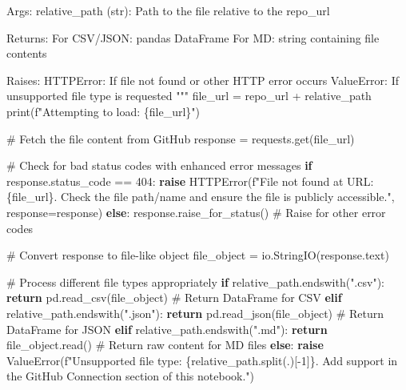 \documentclass[
  11pt,
  letterpaper,
]{book}
\newenvironment{Shaded}{\begin{snugshade}}{\end{snugshade}}
\newcommand{\BuiltInTok}[1]{\textcolor[rgb]{0.00,0.23,0.31}{#1}}
\newcommand{\CommentTok}[1]{\textcolor[rgb]{0.37,0.37,0.37}{#1}}
\newcommand{\ControlFlowTok}[1]{\textcolor[rgb]{0.00,0.23,0.31}{\textbf{#1}}}
\newcommand{\DecValTok}[1]{\textcolor[rgb]{0.68,0.00,0.00}{#1}}
\newcommand{\NormalTok}[1]{\textcolor[rgb]{0.00,0.23,0.31}{#1}}
\newcommand{\OperatorTok}[1]{\textcolor[rgb]{0.37,0.37,0.37}{#1}}
\newcommand{\PreprocessorTok}[1]{\textcolor[rgb]{0.68,0.00,0.00}{#1}}
\newcommand{\SpecialCharTok}[1]{\textcolor[rgb]{0.37,0.37,0.37}{#1}}
\newcommand{\SpecialStringTok}[1]{\textcolor[rgb]{0.13,0.47,0.30}{#1}}
\newcommand{\StringTok}[1]{\textcolor[rgb]{0.13,0.47,0.30}{#1}}
\begin{document}
\begin{Shaded}
\begin{Highlighting}[]
\CommentTok{    Args:}
\CommentTok{        relative\_path (str): Path to the file relative to the repo\_url}

\CommentTok{    Returns:}
\CommentTok{        For CSV/JSON: pandas DataFrame}
\CommentTok{        For MD: string containing file contents}

\CommentTok{    Raises:}
\CommentTok{        HTTPError: If file not found or other HTTP error occurs}
\CommentTok{        ValueError: If unsupported file type is requested}
\CommentTok{    """}
\NormalTok{    file\_url }\OperatorTok{=}\NormalTok{ repo\_url }\OperatorTok{+}\NormalTok{ relative\_path}
    \BuiltInTok{print}\NormalTok{(}\SpecialStringTok{f"Attempting to load: }\SpecialCharTok{\{}\NormalTok{file\_url}\SpecialCharTok{\}}\SpecialStringTok{"}\NormalTok{)}

    \CommentTok{\# Fetch the file content from GitHub}
\NormalTok{    response }\OperatorTok{=}\NormalTok{ requests.get(file\_url)}

    \CommentTok{\# Check for bad status codes with enhanced error messages}
    \ControlFlowTok{if}\NormalTok{ response.status\_code }\OperatorTok{==} \DecValTok{404}\NormalTok{:}
        \ControlFlowTok{raise}\NormalTok{ HTTPError(}\SpecialStringTok{f"File not found at URL: }\SpecialCharTok{\{}\NormalTok{file\_url}\SpecialCharTok{\}}\SpecialStringTok{. Check the file path/name and ensure the file is publicly accessible."}\NormalTok{, response}\OperatorTok{=}\NormalTok{response)}
    \ControlFlowTok{else}\NormalTok{:}
\NormalTok{        response.raise\_for\_status()  }\CommentTok{\# Raise for other error codes}

    \CommentTok{\# Convert response to file{-}like object}
\NormalTok{    file\_object }\OperatorTok{=}\NormalTok{ io.StringIO(response.text)}

    \CommentTok{\# Process different file types appropriately}
    \ControlFlowTok{if}\NormalTok{ relative\_path.endswith(}\StringTok{".csv"}\NormalTok{):}
        \ControlFlowTok{return}\NormalTok{ pd.read\_csv(file\_object)  }\CommentTok{\# Return DataFrame for CSV}
    \ControlFlowTok{elif}\NormalTok{ relative\_path.endswith(}\StringTok{".json"}\NormalTok{):}
        \ControlFlowTok{return}\NormalTok{ pd.read\_json(file\_object)  }\CommentTok{\# Return DataFrame for JSON}
    \ControlFlowTok{elif}\NormalTok{ relative\_path.endswith(}\StringTok{".md"}\NormalTok{):}
        \ControlFlowTok{return}\NormalTok{ file\_object.read()  }\CommentTok{\# Return raw content for MD files}
    \ControlFlowTok{else}\NormalTok{:}
        \ControlFlowTok{raise} \PreprocessorTok{ValueError}\NormalTok{(}\SpecialStringTok{f"Unsupported file type: }\SpecialCharTok{\{}\NormalTok{relative\_path}\SpecialCharTok{.}\NormalTok{split(}\StringTok{\textquotesingle{}.\textquotesingle{}}\NormalTok{)[}\OperatorTok{{-}}\DecValTok{1}\NormalTok{]}\SpecialCharTok{\}}\SpecialStringTok{. Add support in the GitHub Connection section of this notebook."}\NormalTok{)}


\end{Highlighting}
\end{Shaded}
\end{document}
